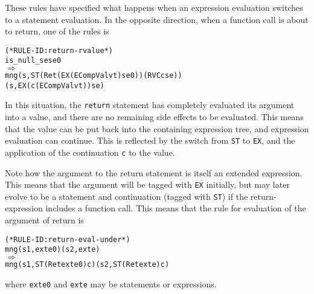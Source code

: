 \documentclass[11pt]{article}
\begin{document}
These rules have specified what happens when an expression evaluation
switches to a statement evaluation.  In the opposite direction, when a
function call is about to return, one of the rules is
\begin{center}
\begin{minipage}{\textwidth}
\label{rule:return-rvalue}
\begin{alltt}
(* RULE-ID: return-rvalue *)
     is_null_se se0
   \(\Rightarrow\)
     mng (s, ST (Ret (EX (ECompVal v t) se0)) (RVC c se))
         (s, EX (c (ECompVal v t)) se)
\end{alltt}
\end{minipage}
\end{center}
In this situation, the \texttt{return} statement has completely
evaluated its argument into a value, and there are no remaining side
effects to be evaluated.  This means that the value can be put back
into the containing expression tree, and expression evaluation can
continue.  This is reflected by the switch from \texttt{ST} to
\texttt{EX}, and the application of the continuation \texttt{c} to the
value.

Note how the argument to the return statement is itself an extended
expression.  This means that the argument will be tagged with
\texttt{EX} initially, but may later evolve to be a statement and
continuation (tagged with \texttt{ST}) if the return-expression
includes a function call.  This means that the rule for evaluation of
the argument of return is
\begin{center}
\begin{minipage}{\textwidth}
\begin{alltt}
(* RULE-ID: return-eval-under *)
     mng (s1, exte0) (s2, exte)
   \(\Rightarrow\)
     mng (s1, ST (Ret exte0) c) (s2, ST (Ret exte) c)
\end{alltt}
\end{minipage}
\end{center}
where \texttt{exte0} and \texttt{exte} may be statements or
expressions.
\end{document}
